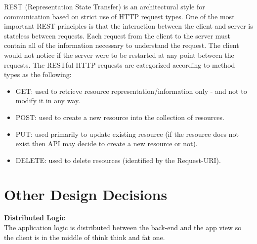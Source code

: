 \documentclass[../RASD.tex]{subfiles}
\begin{document}
    REST (Representation State Transfer) is an architectural style for communication based on strict use of HTTP request types.
    One of the most important REST principles is that the interaction between the client and server is stateless between requests.
    Each request from the client to the server must contain all of the information necessary to understand the request.
    The client would not notice if the server were to be restarted at any point between the requests.
    The RESTful HTTP requests are categorized according to method types as the following:
    \\
    \begin{itemize}
        \item GET: used to retrieve resource representation/information only - and not to modify it in any way.
        \item POST: used to create a new resource into the collection of resources.
        \item PUT: used primarily to update existing resource (if the resource does not exist
        then API may decide to create a new resource or not).
        \item DELETE: used to delete resources (identified by the Request-URI).
    \end{itemize}
    \newpage
    \section{Other Design Decisions}\label{sec:other-design-decisions}
    \textbf{Distributed Logic} \\
    The application logic is distributed between the back-end and the app view so the client is in the middle of think think and fat one.
\end{document}
